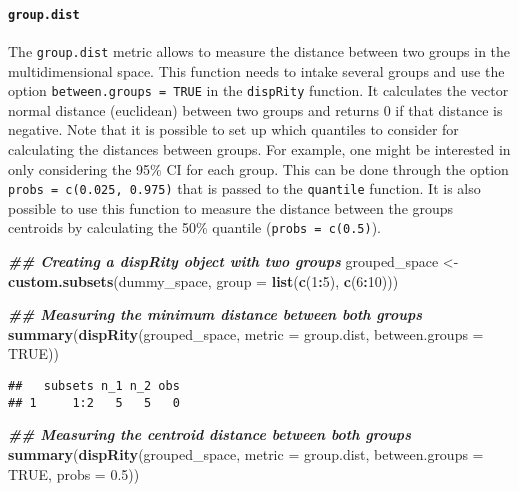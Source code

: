 \documentclass[
]{book}
\newenvironment{Shaded}{\begin{snugshade}}{\end{snugshade}}
\newcommand{\AttributeTok}[1]{\textcolor[rgb]{0.13,0.29,0.53}{#1}}
\newcommand{\ConstantTok}[1]{\textcolor[rgb]{0.56,0.35,0.01}{#1}}
\newcommand{\DecValTok}[1]{\textcolor[rgb]{0.00,0.00,0.81}{#1}}
\newcommand{\DocumentationTok}[1]{\textcolor[rgb]{0.56,0.35,0.01}{\textbf{\textit{#1}}}}
\newcommand{\FloatTok}[1]{\textcolor[rgb]{0.00,0.00,0.81}{#1}}
\newcommand{\FunctionTok}[1]{\textcolor[rgb]{0.13,0.29,0.53}{\textbf{#1}}}
\newcommand{\NormalTok}[1]{#1}
\newcommand{\OtherTok}[1]{\textcolor[rgb]{0.56,0.35,0.01}{#1}}
\newcommand{\SpecialCharTok}[1]{\textcolor[rgb]{0.81,0.36,0.00}{\textbf{#1}}}
\begin{document}
\hypertarget{group.dist}{%
\paragraph{\texorpdfstring{\texttt{group.dist}}{group.dist}}\label{group.dist}}

The \texttt{group.dist} metric allows to measure the distance between two groups in the multidimensional space.
This function needs to intake several groups and use the option \texttt{between.groups\ =\ TRUE} in the \texttt{dispRity} function.
It calculates the vector normal distance (euclidean) between two groups and returns 0 if that distance is negative.
Note that it is possible to set up which quantiles to consider for calculating the distances between groups.
For example, one might be interested in only considering the 95\% CI for each group.
This can be done through the option \texttt{probs\ =\ c(0.025,\ 0.975)} that is passed to the \texttt{quantile} function.
It is also possible to use this function to measure the distance between the groups centroids by calculating the 50\% quantile (\texttt{probs\ =\ c(0.5)}).

\begin{Shaded}
\begin{Highlighting}[]
\DocumentationTok{\#\# Creating a dispRity object with two groups}
\NormalTok{grouped\_space }\OtherTok{\textless{}{-}} \FunctionTok{custom.subsets}\NormalTok{(dummy\_space,}
                      \AttributeTok{group =} \FunctionTok{list}\NormalTok{(}\FunctionTok{c}\NormalTok{(}\DecValTok{1}\SpecialCharTok{:}\DecValTok{5}\NormalTok{), }\FunctionTok{c}\NormalTok{(}\DecValTok{6}\SpecialCharTok{:}\DecValTok{10}\NormalTok{)))}

\DocumentationTok{\#\# Measuring the minimum distance between both groups}
\FunctionTok{summary}\NormalTok{(}\FunctionTok{dispRity}\NormalTok{(grouped\_space, }\AttributeTok{metric =}\NormalTok{ group.dist,}
                 \AttributeTok{between.groups =} \ConstantTok{TRUE}\NormalTok{))}
\end{Highlighting}
\end{Shaded}

\begin{verbatim}
##   subsets n_1 n_2 obs
## 1     1:2   5   5   0
\end{verbatim}

\begin{Shaded}
\begin{Highlighting}[]
\DocumentationTok{\#\# Measuring the centroid distance between both groups}
\FunctionTok{summary}\NormalTok{(}\FunctionTok{dispRity}\NormalTok{(grouped\_space, }\AttributeTok{metric =}\NormalTok{ group.dist,}
                 \AttributeTok{between.groups =} \ConstantTok{TRUE}\NormalTok{, }\AttributeTok{probs =} \FloatTok{0.5}\NormalTok{))}
\end{Highlighting}
\end{Shaded}
\end{document}
